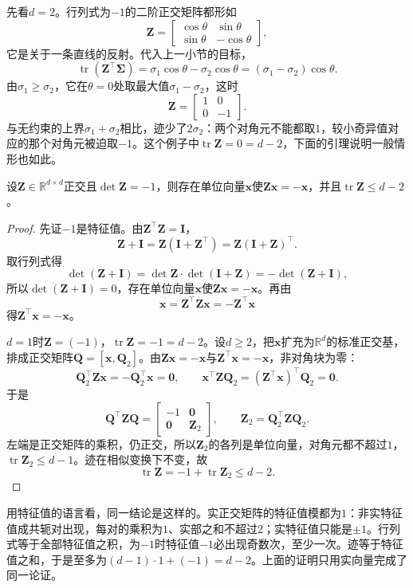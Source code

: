 先看$d=2$。行列式为$-1$的二阶正交矩阵都形如
\[
 \bm Z=\begin{bmatrix}\cos\theta&\sin\theta\\\sin\theta&-\cos\theta\end{bmatrix},
\]
它是关于一条直线的反射。代入上一小节的目标，
\[
 \operatorname{tr}(\bm Z^\top\bm\Sigma)=\sigma_1\cos\theta-\sigma_2\cos\theta=(\sigma_1-\sigma_2)\cos\theta .
\]
由$\sigma_1\geq\sigma_2$，它在$\theta=0$处取最大值$\sigma_1-\sigma_2$，这时
\[
 \bm Z=\begin{bmatrix}1&0\\0&-1\end{bmatrix}.
\]
与无约束的上界$\sigma_1+\sigma_2$相比，迹少了$2\sigma_2$：两个对角元不能都取$1$，较小奇异值对应的那个对角元被迫取$-1$。这个例子中$\operatorname{tr}\bm Z=0=d-2$，下面的引理说明一般情形也如此。

\begin{lemma}[行列式为负的正交矩阵的迹]
\label{lem:matrix-approximation-reflection-trace}
设$\bm Z\in\mathbb R^{d\times d}$正交且$\det\bm Z=-1$，则存在单位向量$\bm x$使$\bm Z\bm x=-\bm x$，并且$\operatorname{tr}\bm Z\leq d-2$。
\end{lemma}
\begin{proof}
先证$-1$是特征值。由$\bm Z^\top\bm Z=\bm I$，
\[
 \bm Z+\bm I=\bm Z(\bm I+\bm Z^\top)=\bm Z(\bm I+\bm Z)^\top .
\]
取行列式得
\[
 \det(\bm Z+\bm I)=\det\bm Z\cdot\det(\bm I+\bm Z)=-\det(\bm Z+\bm I),
\]
所以$\det(\bm Z+\bm I)=0$，存在单位向量$\bm x$使$\bm Z\bm x=-\bm x$。再由
\[
 \bm x=\bm Z^\top\bm Z\bm x=-\bm Z^\top\bm x
\]
得$\bm Z^\top\bm x=-\bm x$。

$d=1$时$\bm Z=(-1)$，$\operatorname{tr}\bm Z=-1=d-2$。设$d\geq2$，把$\bm x$扩充为$\mathbb R^d$的标准正交基，排成正交矩阵$\bm Q=[\bm x,\bm Q_2]$。由$\bm Z\bm x=-\bm x$与$\bm Z^\top\bm x=-\bm x$，非对角块为零：
\[
 \bm Q_2^\top\bm Z\bm x=-\bm Q_2^\top\bm x=\bm0,\qquad
 \bm x^\top\bm Z\bm Q_2=(\bm Z^\top\bm x)^\top\bm Q_2=\bm0 .
\]
于是
\[
 \bm Q^\top\bm Z\bm Q=\begin{bmatrix}-1&\bm0\\\bm0&\bm Z_2\end{bmatrix},\qquad\bm Z_2=\bm Q_2^\top\bm Z\bm Q_2 .
\]
左端是正交矩阵的乘积，仍正交，所以$\bm Z_2$的各列是单位向量，对角元都不超过$1$，$\operatorname{tr}\bm Z_2\leq d-1$。迹在相似变换下不变，故
\[
 \operatorname{tr}\bm Z=-1+\operatorname{tr}\bm Z_2\leq d-2 .
\]
\end{proof}

用特征值的语言看，同一结论是这样的。实正交矩阵的特征值模都为$1$：非实特征值成共轭对出现，每对的乘积为$1$、实部之和不超过$2$；实特征值只能是$\pm1$。行列式等于全部特征值之积，为$-1$时特征值$-1$必出现奇数次，至少一次。迹等于特征值之和，于是至多为$(d-1)\cdot1+(-1)=d-2$。上面的证明只用实向量完成了同一论证。


